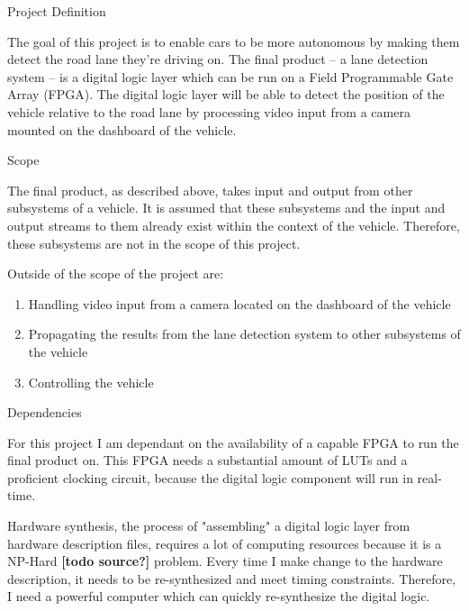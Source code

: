 \documentclass{matthijs}
\begin{document}
	\begin{hoofdstuk}{Project Definition}

		The goal of this project is to enable cars to be more autonomous by making them detect the road lane they're driving on.
		The final product -- a lane detection system -- is a digital logic layer which can be run on a Field Programmable Gate Array (FPGA).
		The digital logic layer will be able to detect the position of the vehicle relative to the road lane by processing video input from a camera mounted on the dashboard of the vehicle.

		\begin{paragraaf}{Scope}

			The final product, as described above, takes input and output from other subsystems of a vehicle.
			It is assumed that these subsystems and the input and output streams to them already exist within the context of the vehicle.
			Therefore, these subsystems are not in the scope of this project.
			
			Outside of the scope of the project are:

			\begin{enumerate}
			
				\item Handling video input from a camera located on the dashboard of the vehicle
				\item Propagating the results from the lane detection system to other subsystems of the vehicle
				\item Controlling the vehicle
			
			\end{enumerate}

		\end{paragraaf}

		\begin{paragraaf}{Dependencies}

			For this project I am dependant on the availability of a capable FPGA to run the final product on.
			This FPGA needs a substantial amount of LUTs and a proficient clocking circuit, because the digital logic component will run in real-time.
		
			Hardware synthesis, the process of "assembling" a digital logic layer from hardware description files, requires a lot of computing resources because it is a NP-Hard \textbf{[todo source?]} problem.
			Every time I make change to the hardware description, it needs to be re-synthesized and meet timing constraints.
			Therefore, I need a powerful computer which can quickly re-synthesize the digital logic.


\end{paragraaf}
\end{hoofdstuk}
\end{document}
